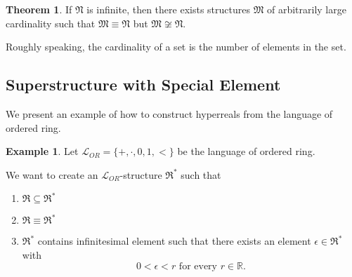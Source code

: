\documentclass[11pt,letterpaper]{book}
\theoremstyle{definition}
\newtheorem{theorem}{Theorem}[section]
\newtheorem{example}{Example}[section]
\begin{document}
\begin{theorem}
If $\mathfrak{N}$ is infinite, then there exists structures
$\mathfrak{M}$ of arbitrarily large cardinality such that $\mathfrak{M}
\equiv \mathfrak{N} $ but $\mathfrak{M} \not \cong \mathfrak{N} $.
\end{theorem}

Roughly speaking, the cardinality of a set is the number of elements in the set.

\subsection{Superstructure with Special Element}

We present an example of how to construct hyperreals from the language of ordered ring.

\begin{example}
Let $\mathcal{L}_{OR} = \{ +, \cdot, 0, 1, <  \}$ be the language of
ordered ring.

We want to create an $\mathcal{L}_{OR}$-structure $\mathfrak{R}^*$ such that
\begin{enumerate}
\item{$\mathfrak{R} \subseteq \mathfrak{R}^*  $}
\item{$\mathfrak{R} \equiv \mathfrak{R}^* $}
\item{$\mathfrak{R}^*$ contains infinitesimal element such that there exists
an element $\epsilon \in \mathfrak{R}^*$ with
$$ 0 < \epsilon < r \text{ for every } r \in \mathbb{R}. $$
}
\end{enumerate}

\end{example}
\end{document}
